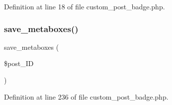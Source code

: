 Definition at line 18 of file custom\+\_\+post\+\_\+badge.\+php.

\mbox{\label{custom__post__badge_8php_a28bdcc9bcf574671a008a4e559b1eb11}} 
\subsubsection{\texorpdfstring{save\+\_\+metaboxes()}{save\_metaboxes()}}
{\footnotesize\ttfamily save\+\_\+metaboxes (\begin{DoxyParamCaption}\item[{}]{\$post\+\_\+\+ID }\end{DoxyParamCaption})}



Definition at line 236 of file custom\+\_\+post\+\_\+badge.\+php.

